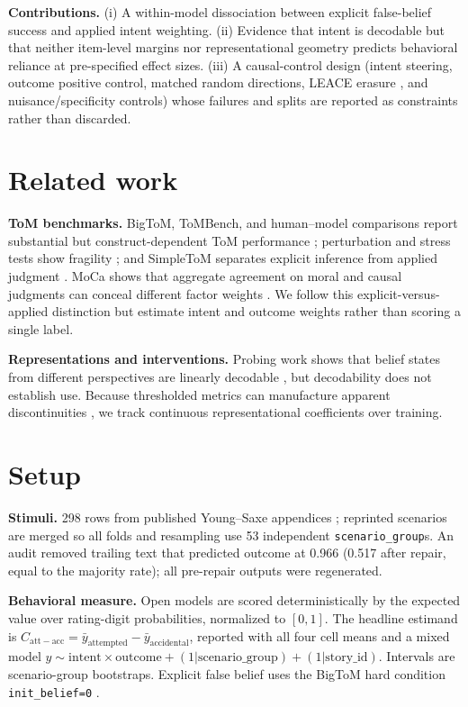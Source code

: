 \documentclass{article}
\newcommand{\contrast}{C_{\mathrm{att-acc}}}
\begin{document}
\textbf{Contributions.}
(i) A within-model dissociation between explicit false-belief success and applied intent weighting.
(ii) Evidence that intent is decodable but that neither item-level margins nor representational geometry predicts behavioral reliance at pre-specified effect sizes.
(iii) A causal-control design (intent steering, outcome positive control, matched random directions, LEACE erasure \citep{belrose2023leace}, and nuisance/specificity controls) whose failures and splits are reported as constraints rather than discarded.

\section{Related work}

\textbf{ToM benchmarks.}
BigToM, ToMBench, and human--model comparisons report substantial but construct-dependent ToM performance \citep{gandhi2023bigtom,chen2024tombench,strachan2024testing}; perturbation and stress tests show fragility \citep{ullman2023alterations,shapira2024clever}; and SimpleToM separates explicit inference from applied judgment \citep{gu2026simpletom}.
MoCa shows that aggregate agreement on moral and causal judgments can conceal different factor weights \citep{nie2023moca}.
We follow this explicit-versus-applied distinction but estimate intent and outcome weights rather than scoring a single label.

\textbf{Representations and interventions.}
Probing work shows that belief states from different perspectives are linearly decodable \citep{zhu2024beliefs}, but decodability does not establish use.
Because thresholded metrics can manufacture apparent discontinuities \citep{schaeffer2023emergent}, we track continuous representational coefficients over training.

\section{Setup}

\textbf{Stimuli.}
298 rows from published Young--Saxe appendices \citep{young2008belief,young2009innocent,young2011ignorance}; reprinted scenarios are merged so all folds and resampling use 53 independent \texttt{scenario\_group}s.
An audit removed trailing text that predicted outcome at 0.966 (0.517 after repair, equal to the majority rate); all pre-repair outputs were regenerated.

\textbf{Behavioral measure.}
Open models are scored deterministically by the expected value over rating-digit probabilities, normalized to $[0,1]$.
The headline estimand is $\contrast=\bar y_{\mathrm{attempted}}-\bar y_{\mathrm{accidental}}$, reported with all four cell means and a mixed model $y\sim\mathrm{intent}\times\mathrm{outcome}+(1|\mathrm{scenario\_group})+(1|\mathrm{story\_id})$.
Intervals are scenario-group bootstraps.
Explicit false belief uses the BigToM hard condition \texttt{init\_belief=0} \citep{gandhi2023bigtom}.
\end{document}
